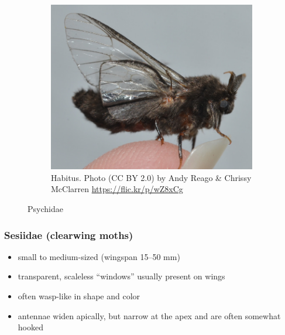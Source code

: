 \documentclass[letterpaper, 11pt]{article}
\begin{document}
\begin{figure}[ht!]
\begin{subfigure}[ht!]{0.35\textwidth}
        \includegraphics[width=\textwidth]{psychid1}
        \caption{Habitus. Photo (CC BY 2.0) by Andy Reago \& Chrissy McClarren \url{https://flic.kr/p/wZ8xCg}}
        \label{fig:psychid3}
    \end{subfigure}
    \caption{Psychidae}\label{fig:psychids}
\end{figure}

\subsubsection{Sesiidae (clearwing moths)}
\begin{itemize}
\item small to medium-sized (wingspan 15--50 mm)
\item transparent, scaleless ``windows'' usually present on wings
\item often wasp-like in shape and color
\item antennae widen apically, but narrow at the apex and are often somewhat hooked
\end{itemize}
\end{document}

